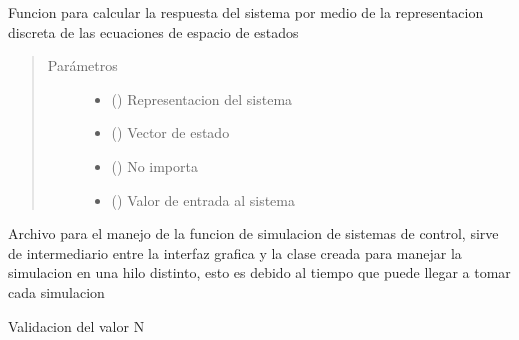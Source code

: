 \documentclass[letterpaper,10pt,spanish]{sphinxmanual}
\begin{document}
\begin{fulllineitems}
\label{\detokenize{codigos/discreto_generator:discreto_generator.ss_discreta}}
Funcion para calcular la respuesta del sistema por medio de la representacion discreta de las ecuaciones de espacio de estados
\begin{quote}\begin{description}
\item[{Parámetros}] \leavevmode\begin{itemize}
\item {} 
 () \textendash{} Representacion del sistema

\item {} 
 () \textendash{} Vector de estado

\item {} 
\sphinxstyleliteralstrong{\sphinxupquote{\_}} () \textendash{} No importa

\item {} 
 () \textendash{} Valor de entrada al sistema

\end{itemize}

\end{description}\end{quote}

\end{fulllineitems}

\label{\detokenize{codigos/simulacionHandler:module-simulacionHandler}}
Archivo para el manejo de la funcion de simulacion de sistemas de control, sirve de intermediario entre la interfaz grafica y la clase creada para manejar la simulacion en una hilo distinto, esto es debido al tiempo que puede llegar a tomar cada simulacion

\begin{fulllineitems}
\label{\detokenize{codigos/simulacionHandler:simulacionHandler.N_validator}}
Validacion del valor N

\end{fulllineitems}
\end{document}
